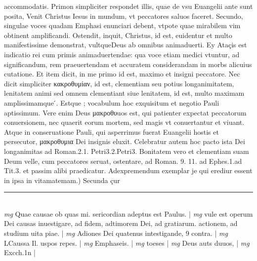 \documentclass{article}
\begin{document}
\begin{pages}
accommodatis. Primon simpliciter respondet illis, quae de vsu Euangelii ante sunt posita, Venit Christus Iesus in mundum, vt peccatores saluos faceret. Secundo, singulae voces quadam Emphasi enunciari debent, vtpote quae mirabilem vim obtinent amplificandi. Ostendit, inquit, Christus, id est, euidentur et multo manifestissime demonstrat, vultqueDeus ab omnibus animaduerti. Ey Ataçis est indicatio rei cum primis animaduertendae: qua voce etiam medici vtuntur, ad significandum, rem praeuertendam et accuratem considerandam in morbs alicuius cutatione. Et item dicit, in me primo id est, maximo et insigni peccatore. Nec dicit simpliciter κακροθυμίαν, id est, clementiam seu potius longanimitatem, lenitatem animi sed omnem clementiant siue lenitatem, id est, multo maximam amplissimamque ́. Estque ; vocabulum hoc exquisitum et negotio Pauli aptissimum. Vere enim Deus μακροθυuos est, qui patienter expectat peccatorum conuersionem, nec quaerit eorum mortem, sed magis vt conuertantur et viuant. Atque  in conseruatione Pauli, qui asperrimus fuerat Euangelii hostis et persecutor, μακροθυμια Dei insignis eluxit. Celebratur autem hoc pacto ista Dei longanimitas ad Roman.2.1. Petri3.2.Petri3. Bonitatem vero et clementiam suam Deum velle, cum peccatores seruat, ostentare, ad Roman. 9. 11. ad Ephes.1.ad Tit.3. et passim alibi praedicatur.  \pend\pstart Adexpremendum exemplar je qui erediur essent in ipsa in vitamatemam.) Secunda çur  \pend
\vspace{0.5cm}\noindent
\vspace{0.2cm}\rule{1cm}{0.2pt}\\ 
\hspace{0.2cm}\textit{mg}
\footnotesize Quae causae ob quas mi. sericordian adeptus est Paulus. 
\normalsize| 
\hspace{0.2cm}\textit{mg}
\footnotesize vule est operum Dei causas inuestigare, ad fidem, adtimorem Dei, ad gratiarum. actionem, ad studium uita piae. 
\normalsize| 
\hspace{0.2cm}\textit{mg}
\footnotesize Adiones Dei quatenus intestigande, 9 contra. 
\normalsize| 
\hspace{0.2cm}\textit{mg}
\footnotesize LCaussa Il. uspos repes. 
\normalsize| 
\hspace{0.2cm}\textit{mg}
\footnotesize Emphaseis. 
\normalsize| 
\hspace{0.2cm}\textit{mg}
\footnotesize toeses 
\normalsize| 
\hspace{0.2cm}\textit{mg}
\footnotesize Deus auts duuos, 
\normalsize| 
\hspace{0.2cm}\textit{mg}
\footnotesize Excch.1n 
\normalsize| 

\end{pages}
\end{document}
